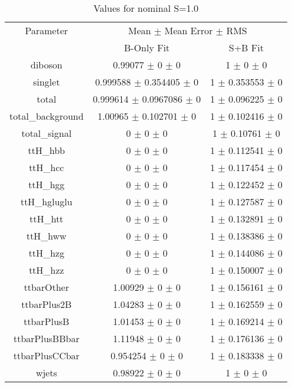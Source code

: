 \begin{table}
\centering
\caption{Values for nominal S=1.0}
\begin{tabular}{ccc}
\toprule
Parameter & \multicolumn{2}{c}{Mean $\pm$ Mean Error $\pm$ RMS}\\
 & B-Only Fit & S+B Fit\\
\midrule
diboson & \num{0.99077} $\pm$ \num{0} $\pm$ \num{0} & \num{1} $\pm$ \num{0} $\pm$ \num{0}\\
singlet & \num{0.999588} $\pm$ \num{0.354405} $\pm$ \num{0} & \num{1} $\pm$ \num{0.353553} $\pm$ \num{0}\\
total & \num{0.999614} $\pm$ \num{0.0967086} $\pm$ \num{0} & \num{1} $\pm$ \num{0.096225} $\pm$ \num{0}\\
total\_background & \num{1.00965} $\pm$ \num{0.102701} $\pm$ \num{0} & \num{1} $\pm$ \num{0.102416} $\pm$ \num{0}\\
total\_signal & \num{0} $\pm$ \num{0} $\pm$ \num{0} & \num{1} $\pm$ \num{0.10761} $\pm$ \num{0}\\
ttH\_hbb & \num{0} $\pm$ \num{0} $\pm$ \num{0} & \num{1} $\pm$ \num{0.112541} $\pm$ \num{0}\\
ttH\_hcc & \num{0} $\pm$ \num{0} $\pm$ \num{0} & \num{1} $\pm$ \num{0.117454} $\pm$ \num{0}\\
ttH\_hgg & \num{0} $\pm$ \num{0} $\pm$ \num{0} & \num{1} $\pm$ \num{0.122452} $\pm$ \num{0}\\
ttH\_hgluglu & \num{0} $\pm$ \num{0} $\pm$ \num{0} & \num{1} $\pm$ \num{0.127587} $\pm$ \num{0}\\
ttH\_htt & \num{0} $\pm$ \num{0} $\pm$ \num{0} & \num{1} $\pm$ \num{0.132891} $\pm$ \num{0}\\
ttH\_hww & \num{0} $\pm$ \num{0} $\pm$ \num{0} & \num{1} $\pm$ \num{0.138386} $\pm$ \num{0}\\
ttH\_hzg & \num{0} $\pm$ \num{0} $\pm$ \num{0} & \num{1} $\pm$ \num{0.144086} $\pm$ \num{0}\\
ttH\_hzz & \num{0} $\pm$ \num{0} $\pm$ \num{0} & \num{1} $\pm$ \num{0.150007} $\pm$ \num{0}\\
ttbarOther & \num{1.00929} $\pm$ \num{0} $\pm$ \num{0} & \num{1} $\pm$ \num{0.156161} $\pm$ \num{0}\\
ttbarPlus2B & \num{1.04283} $\pm$ \num{0} $\pm$ \num{0} & \num{1} $\pm$ \num{0.162559} $\pm$ \num{0}\\
ttbarPlusB & \num{1.01453} $\pm$ \num{0} $\pm$ \num{0} & \num{1} $\pm$ \num{0.169214} $\pm$ \num{0}\\
ttbarPlusBBbar & \num{1.11948} $\pm$ \num{0} $\pm$ \num{0} & \num{1} $\pm$ \num{0.176136} $\pm$ \num{0}\\
ttbarPlusCCbar & \num{0.954254} $\pm$ \num{0} $\pm$ \num{0} & \num{1} $\pm$ \num{0.183338} $\pm$ \num{0}\\
wjets & \num{0.98922} $\pm$ \num{0} $\pm$ \num{0} & \num{1} $\pm$ \num{0} $\pm$ \num{0}\\
\bottomrule
\end{tabular}
\end{table}